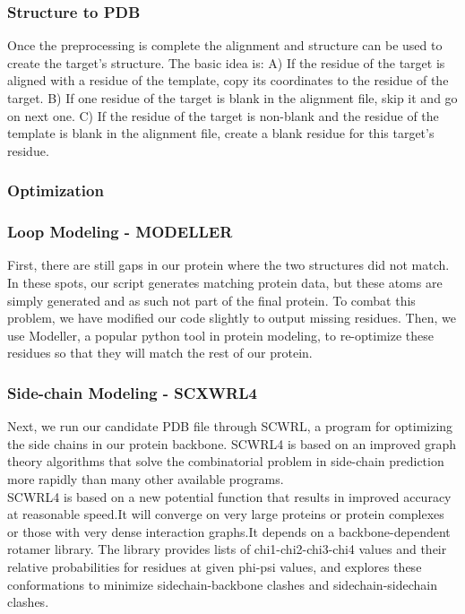 \documentclass{article}
\begin{document}
\subsubsection*{Structure to PDB}

Once the preprocessing is complete the alignment and structure can be used to create the target's structure. The basic idea is:
A) If the residue of the target is aligned with a residue of the template, copy its coordinates to the residue of the target. 
B) If one residue of the target is blank in the alignment file, skip it and go on next one.
C) If the residue of the target is non-blank and the residue of the template is blank in the alignment file, create a blank residue for this target’s residue.


\subsubsection{Optimization}


\subsubsection*{Loop Modeling - MODELLER}

First, there are still gaps in our protein where the two structures did not match. In these spots, our script generates matching protein data, but these atoms are simply generated and as such not part of the final protein. To combat this problem, we have modified our code slightly to output missing residues. Then, we use Modeller, a popular python tool in protein modeling, to re-optimize these residues so that they will match the rest of our protein.


\subsubsection*{Side-chain Modeling - SCXWRL4}

Next, we run our candidate PDB file through SCWRL, a program for optimizing the side chains in our protein backbone. SCWRL4 is based on an improved graph theory algorithms that solve the combinatorial problem in side-chain prediction more rapidly than many other available programs.\\

SCWRL4 is based on a new potential function that results in improved accuracy at reasonable speed.It will converge on very large proteins or protein complexes or those with very dense interaction graphs.It depends on a backbone-dependent rotamer library. The library provides lists of chi1-chi2-chi3-chi4 values and their relative probabilities for residues at given phi-psi values, and explores these conformations to minimize sidechain-backbone clashes and sidechain-sidechain clashes.\\
\end{document}
